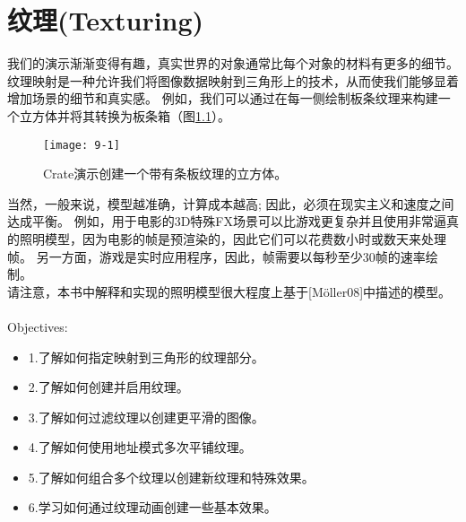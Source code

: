 \chapter{纹理(Texturing)}
\begin{flushleft}
我们的演示渐渐变得有趣，真实世界的对象通常比每个对象的材料有更多的细节。 纹理映射是一种允许我们将图像数据映射到三角形上的技术，从而使我们能够显着增加场景的细节和真实感。 例如，我们可以通过在每一侧绘制板条纹理来构建一个立方体并将其转换为板条箱（图\ref{fig:9-1}）。
\end{flushleft}

\begin{figure}[h]
    \label{fig:9-1}
    \texttt{[image: 9-1]}
    \centering
    \caption{Crate演示创建一个带有条板纹理的立方体。}
\end{figure}

\begin{flushleft}
当然，一般来说，模型越准确，计算成本越高; 因此，必须在现实主义和速度之间达成平衡。 例如，用于电影的3D特殊FX场景可以比游戏更复杂并且使用非常逼真的照明模型，因为电影的帧是预渲染的，因此它们可以花费数小时或数天来处理帧。 另一方面，游戏是实时应用程序，因此，帧需要以每秒至少30帧的速率绘制。\\
请注意，本书中解释和实现的照明模型很大程度上基于[Möller08]中描述的模型。\\
~\\
{\large Objectives:}
\begin{itemize}
    \item 1.了解如何指定映射到三角形的纹理部分。
    \item 2.了解如何创建并启用纹理。
    \item 3.了解如何过滤纹理以创建更平滑的图像。
    \item 4.了解如何使用地址模式多次平铺纹理。
    \item 5.了解如何组合多个纹理以创建新纹理和特殊效果。
    \item 6.学习如何通过纹理动画创建一些基本效果。
\end{itemize}
\end{flushleft}

